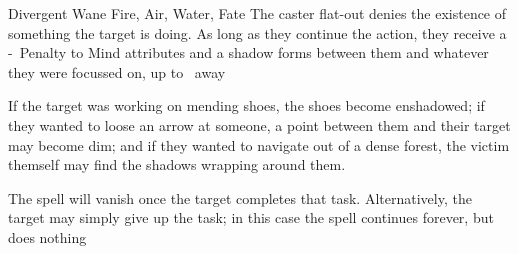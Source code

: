   {Divergent}%
  {Wane}%
  {Fire, Air, Water, Fate}%
  {}%
  {The caster flat-out denies the existence of something the target is doing.
  As long as they continue the action, they receive a -~Penalty to Mind \glspl{attribute} and a shadow forms between them and whatever they were focussed on, up to \spellRange\ away}%
  {If the target was working on mending shoes, the shoes become enshadowed; if they wanted to loose an arrow at someone, a point between them and their target may become dim; and if they wanted to navigate out of a dense forest, the victim themself may find the shadows wrapping around them.

  The spell will vanish once the target completes that task.
  Alternatively, the target may simply give up the task; in this case the \gls{spell} continues forever, but does nothing}

